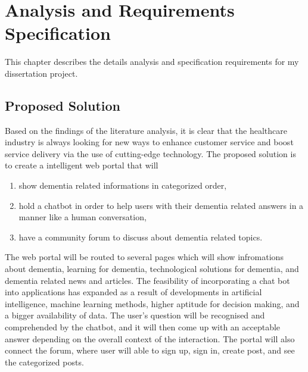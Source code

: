 \def\baselinestretch{1}

\chapter{Analysis and Requirements Specification}

\def\baselinestretch{1.44}


This chapter describes the details analysis and specification requirements for my dissertation project. 

\smallskip

\goodbreak
\section{Proposed Solution}
Based on the findings of the literature analysis, it is clear that the healthcare industry is always looking for new ways to enhance customer service and boost service delivery via the use of cutting-edge technology. The proposed solution is to create a intelligent web portal that will
\begin{enumerate}[label=\arabic*)]
	\item show dementia related informations in categorized order,
	\item hold a chatbot in order to help users with their dementia related answers in a manner like a human conversation, 
	\item have a community forum to discuss about dementia related topics.
\end{enumerate}

The web portal will be routed to several pages which will show infromations about dementia, learning for dementia, technological solutions for dementia, and dementia related news and articles. The feasibility of incorporating a chat bot into applications has expanded as a result of developments in artificial intelligence, machine learning methods, higher aptitude for decision making, and a bigger availability of data. The user's question will be recognised and comprehended by the chatbot, and it will then come up with an acceptable answer depending on the overall context of the interaction. The portal will also connect the forum, where user will able to sign up, sign in, create post, and see the categorized posts.

